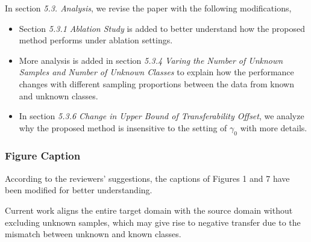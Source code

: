 In section \textit{5.3. Analysis}, we revise the paper with the following modifications,
\begin{itemize}[topsep=0pt]
    \small
    \item Section \textit{5.3.1 Ablation Study} is added to better understand how the proposed method performs under ablation settings.
    \item More analysis is added in section \textit{5.3.4 Varing the Number of Unknown Samples and Number of Unknown Classes} to explain how the performance changes with different sampling proportions between the data from known and unknown classes.
    \item In section \textit{5.3.6 Change in Upper Bound of Transferability Offset}, we analyze why the proposed method is insensitive to the setting of $\gamma_0$ with more details.
\end{itemize}

\subsubsection*{{\textbf{Figure Caption}}}
According to the reviewers' suggestions, the captions of Figures 1 and 7 have been modified for better understanding.


Current work aligns the entire target domain with the source domain without excluding unknown samples, which may give rise to negative transfer due to the mismatch between unknown and known classes.